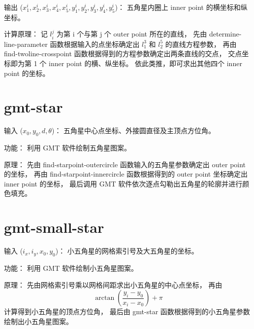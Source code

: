 \documentclass[UTF8]{ctexart}
\begin{document}
输出 ($x_1^i, x_2^i, x_3^i, x_4^i, x_5^i,
y_1^i, y_2^i, y_3^i, y_4^i, y_5^i$)：
五角星内圈上 inner point 的横坐标和纵坐标。

计算原理：
记 $l_i^j$ 为第 i 个与第 j 个 outer point 所在的直线，
先由 determine-line-parameter 函数根据输入的点坐标确定出 $l_1^3$ 和 $l_2^5$ 的直线方程参数，
再由 find-twoline-crosspoint 函数根据得到的方程参数确定出两条直线的交点，
交点坐标即为第 1 个 inner point 的横、纵坐标。
依此类推，即可求出其他四个 inner point 的坐标。

\section{gmt-star}
输入 ($x_0, y_0, d, \theta$)：
五角星中心点坐标、外接圆直径及主顶点方位角。

功能：
利用 GMT 软件绘制五角星图案。

原理：
先由 find-starpoint-outercircle 函数输入的五角星参数确定出 outer point 的坐标，
再由 find-starpoint-innercircle 函数根据得到的 outer point 坐标确定出 inner point 的坐标，
最后调用 GMT 软件依次逐点勾勒出五角星的轮廓并进行颜色填充。

\section{gmt-small-star}
输入 ($i_x, i_y, x_0, y_0$)：
小五角星的网格索引号及大五角星的坐标。

功能：
利用 GMT 软件绘制小五角星图案。

原理：
先由网格索引号乘以网格间距求出小五角星的中心点坐标，
再由
\[ \arctan \left( \frac{y_i - y_0}{x_i - x_0} \right) + \pi \]
计算得到小五角星的顶点方位角，
最后由 gmt-star 函数根据得到的小五角星参数绘制出小五角星图案。
\end{document}
